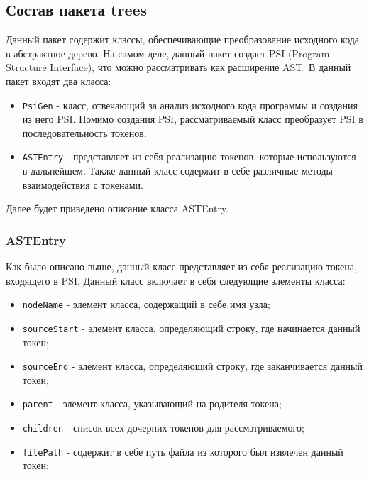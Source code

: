 \subsection{Состав пакета trees}

Данный пакет содержит классы, обеспечивающие преобразование исходного кода в абстрактное дерево. На самом деле, данный пакет создает PSI (Program Structure Interface), что можно рассматривать как расширение AST. В данный пакет входят два класса:

\begin{itemize}
\setlength\itemsep{0mm}
\item \texttt{PsiGen} - класс, отвечающий за анализ исходного кода программы и создания из него PSI. Помимо создания PSI, рассматриваемый класс преобразует PSI в последовательность токенов.
\item \texttt{ASTEntry} - представляет из себя реализацию токенов, которые используются в дальнейшем. Также данный класс содержит в себе различные методы взаимодействия с токенами.
\end{itemize}


Далее будет приведено описание класса ASTEntry.

\subsubsection{ASTEntry}

Как было описано выше, данный класс представляет из себя реализацию токена, входящего в PSI. Данный класс включает в себя следующие элементы класса:

\begin{itemize}
\setlength\itemsep{0mm}
\item \texttt{nodeName} - элемент класса, содержащий в себе имя узла;
\item \texttt{sourceStart} - элемент класса, определяющий строку, где начинается данный токен;
\item \texttt{sourceEnd} - элемент класса, определяющий строку, где заканчивается данный токен;
\item \texttt{parent} - элемент класса, указывающий на родителя токена;
\item \texttt{children} - список всех дочерних токенов для рассматриваемого;
\item \texttt{filePath} - содержит в себе путь файла из которого был извлечен данный токен;
\end{itemize}

